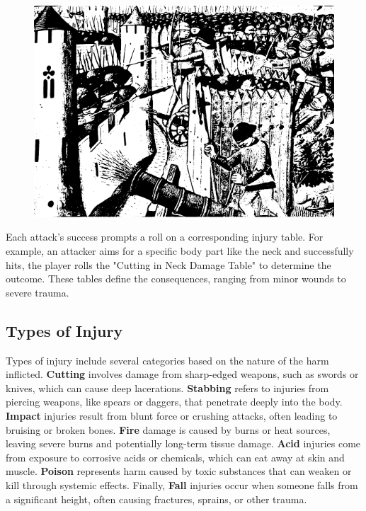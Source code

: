 \documentclass[12pt]{book}  %
\begin{document}
\begin{figure}[h]
    \centering
    \includegraphics[width=\textwidth]{./images/combat02.pdf}
\end{figure}

Each attack's success prompts a roll on a corresponding injury table. For example, an attacker aims for a specific body part like the neck and successfully hits, the player rolls the "Cutting in Neck Damage Table" to determine the outcome. These tables define the consequences, ranging from minor wounds to severe trauma.

\subsection{Types of Injury}

Types of injury include several categories based on the nature of the harm inflicted. \textbf{Cutting} involves damage from sharp-edged weapons, such as swords or knives, which can cause deep lacerations. \textbf{Stabbing} refers to injuries from piercing weapons, like spears or daggers, that penetrate deeply into the body. \textbf{Impact} injuries result from blunt force or crushing attacks, often leading to bruising or broken bones. \textbf{Fire} damage is caused by burns or heat sources, leaving severe burns and potentially long-term tissue damage. \textbf{Acid} injuries come from exposure to corrosive acids or chemicals, which can eat away at skin and muscle. \textbf{Poison} represents harm caused by toxic substances that can weaken or kill through systemic effects. Finally, \textbf{Fall} injuries occur when someone falls from a significant height, often causing fractures, sprains, or other trauma.
\end{document}
